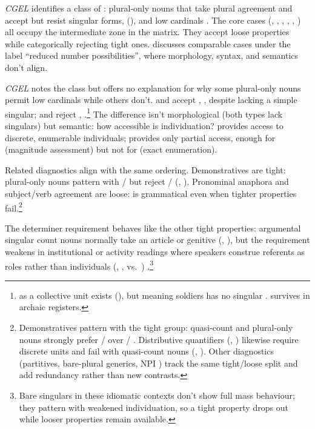 \documentclass[12pt,a4paper]{article}
\begin{document}
\textit{CGEL} identifies a class of : plural-only nouns that take plural agreement and accept  but resist singular forms, (), and low cardinals \citep[p.~345]{huddleston2002}. The core cases (, , , , , ) all occupy the intermediate zone in the matrix. They accept loose properties while categorically rejecting tight ones. \textcite{corbett2019} discusses comparable cases under the label \enquote{reduced number possibilities}, where morphology, syntax, and semantics don't align.

\textit{CGEL} notes the class but offers no explanation for why some plural-only nouns permit low cardinals while others don't.  and  accept , , despite lacking a simple singular;  and  reject ,  \citep[p.~345]{huddleston2002}.\footnote{ as a collective unit exists (), but  meaning soldiers has no singular .  survives in archaic registers.} The difference isn't morphological (both types lack singulars) but semantic: how accessible is individuation?  provides access to discrete, enumerable individuals;  provides only partial access, enough for  (magnitude assessment) but not for  (exact enumeration).

Related diagnostics align with the same ordering. Demonstratives are tight: plural-only nouns pattern with / but reject / (, ). Pronominal anaphora and subject/verb agreement are loose:  is grammatical even when tighter properties fail.\footnote{Demonstratives pattern with the tight group: quasi-count and plural-only nouns strongly prefer / over / \citep[p.~356]{huddleston2002}. Distributive quantifiers (, ) likewise require discrete units and fail with quasi-count nouns (, ). Other diagnostics (partitives, bare-plural generics, NPI ) track the same tight/loose split and add redundancy rather than new contrasts.}

The determiner requirement behaves like the other tight properties: argumental singular count nouns normally take an article or genitive (, ), but the requirement weakens in institutional or activity readings where speakers construe referents as roles rather than individuals (, ,  vs.\ ) \citep[pp.~409--410]{huddleston2002}.\footnote{Bare singulars in these idiomatic contexts don't show full mass behaviour; they pattern with weakened individuation, so a tight property drops out while looser properties remain available.}
\end{document}
